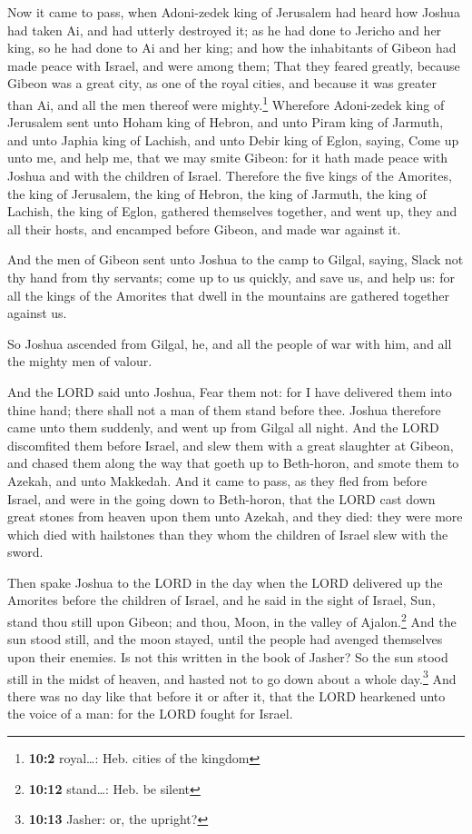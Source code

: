 Now it came to pass, when Adoni-zedek king of Jerusalem
had heard how Joshua had taken Ai, and had utterly destroyed it; as he
had done to Jericho and her king, so he had done to Ai and her king; and
how the inhabitants of Gibeon had made peace with Israel, and were among
them;  That they feared greatly, because Gibeon was a
great city, as one of the royal cities, and because it was greater than
Ai, and all the men thereof were mighty.\footnote{\textbf{10:2}
  royal\ldots: Heb. cities of the kingdom}  Wherefore
Adoni-zedek king of Jerusalem sent unto Hoham king of Hebron, and unto
Piram king of Jarmuth, and unto Japhia king of Lachish, and unto Debir
king of Eglon, saying,  Come up unto me, and help me, that
we may smite Gibeon: for it hath made peace with Joshua and with the
children of Israel.  Therefore the five kings of the
Amorites, the king of Jerusalem, the king of Hebron, the king of
Jarmuth, the king of Lachish, the king of Eglon, gathered themselves
together, and went up, they and all their hosts, and encamped before
Gibeon, and made war against it.

 And the men of Gibeon sent unto Joshua to the camp to
Gilgal, saying, Slack not thy hand from thy servants; come up to us
quickly, and save us, and help us: for all the kings of the Amorites
that dwell in the mountains are gathered together against us.

 So Joshua ascended from Gilgal, he, and all the people of
war with him, and all the mighty men of valour.

 And the LORD said unto Joshua, Fear them not: for I have
delivered them into thine hand; there shall not a man of them stand
before thee.  Joshua therefore came unto them suddenly,
and went up from Gilgal all night.  And the LORD
discomfited them before Israel, and slew them with a great slaughter at
Gibeon, and chased them along the way that goeth up to Beth-horon, and
smote them to Azekah, and unto Makkedah.  And it came to
pass, as they fled from before Israel, and were in the going down to
Beth-horon, that the LORD cast down great stones from heaven upon them
unto Azekah, and they died: they were more which died with hailstones
than they whom the children of Israel slew with the sword.

 Then spake Joshua to the LORD in the day when the LORD
delivered up the Amorites before the children of Israel, and he said in
the sight of Israel, Sun, stand thou still upon Gibeon; and thou, Moon,
in the valley of Ajalon.\footnote{\textbf{10:12} stand\ldots: Heb. be
  silent}  And the sun stood still, and the moon stayed,
until the people had avenged themselves upon their enemies. Is not this
written in the book of Jasher? So the sun stood still in the midst of
heaven, and hasted not to go down about a whole day.\footnote{\textbf{10:13}
  Jasher: or, the upright?}  And there was no day like
that before it or after it, that the LORD hearkened unto the voice of a
man: for the LORD fought for Israel.

